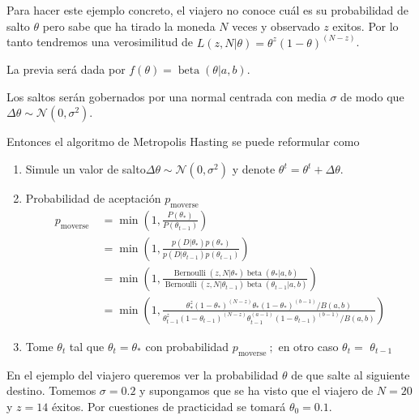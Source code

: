 \documentclass[
  12pt,
]{book}
\theoremstyle{definition}
\theoremstyle{definition}
\theoremstyle{definition}
\theoremstyle{definition}
\theoremstyle{remark}
\begin{document}
Para hacer este ejemplo concreto, el viajero no conoce cuál es su
probabilidad de salto \(\theta\) pero sabe que ha tirado la
moneda \(N\) veces y observado \(z\) exitos. Por lo tanto tendremos
una verosimilitud de \(L(z, N | \theta)=\theta^{z}(1-\theta)^{(N-z)}\).

La previa será dada por \(f(\theta)=\operatorname{beta}(\theta | a, b)\).

Los saltos serán gobernados por una normal centrada con media
\(\sigma\) de modo que \(\Delta \theta \sim \mathcal{N}\left(0,\sigma^{2}\right)\).

Entonces el algoritmo de Metropolis Hasting se puede reformular como

\begin{enumerate}
\def\labelenumi{\arabic{enumi}.}
\item
  Simule un valor de salto\(\Delta \theta \sim \mathcal{N}\left(0,\sigma^{2}\right)\) y denote \(\theta^{t} = \theta^{t} + \Delta\theta\).
\item
  Probabilidad de aceptación \(p_{\text {moverse }}\)
  \begin{align*}
   p_{\text {moverse }}
  & =\min \left(1, \frac{P\left(\theta_{\ast}\right)}{P\left(\theta_{t-1}\right)}\right) \\
     & =\min \left(1, \frac{p\left(D |
    \theta_{\ast}\right) p\left(\theta_{\ast}\right)}{p\left(D | \theta_{t-1}\right)
    p\left(\theta_{t-1}\right)}\right) \\
  & =\min \left(1, \frac{\operatorname{Bernoulli}\left(z, N |
    \theta_{\ast}\right)
    \operatorname{beta}\left(\theta_{\ast} | a,
    b\right)}{\operatorname{Bernoulli}\left(z, N |
    \theta_{t-1}\right)
    \operatorname{beta}\left(\theta_{t-1} | a, b\right)}\right) \\
  & =\min \left(1,
   \frac{\theta_{\ast}^{z}\left(1-\theta_{\ast}\right)^{(N-z)}
  \theta_{\ast} \left(1-\theta_{\ast}\right)^{(b-1)}
  / B(a,b)}{\theta_{t-1}^{z}\left(1-\theta_{t-1}\right)^{(N-z)}
  \theta_{t-1}^{(a-1)}\left(1-\theta_{t-1}\right)^{(b-1)}
  / B(a, b)}\right)
  \end{align*}
\item
  Tome \(\theta_{t}\) tal que \(\theta_{t}=\theta_{*}\)
  con probabilidad \(p_{\text {moverse }} ;\) en otro caso \(\theta_{t}=\) \(\theta_{t-1}\)
\end{enumerate}

En el ejemplo del viajero queremos ver la probabilidad \(\theta\) de
que salte al siguiente destino. Tomemos \(\sigma=0.2\) y supongamos
que se ha visto que el viajero de \(N=20\) y \(z=14\) éxitos. Por
cuestiones de practicidad se tomará \(\theta_0 = 0.1\).
\end{document}
